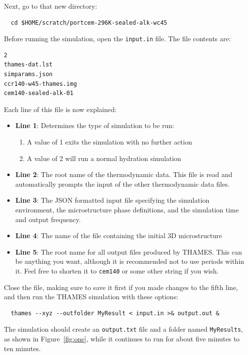 \documentclass{article}
\begin{document}
\normalsize{ }
Next, go to that new directory:
\scriptsize{
	\begin{lstlisting}
  cd $HOME/scratch/portcem-296K-sealed-alk-wc45
\end{lstlisting}
}

\normalsize{ }
Before running the simulation, open the \verb!input.in! file. The file contents
are:
\scriptsize{
	\begin{lstlisting}
2
thames-dat.lst
simparams.json
ccr140-w45-thames.img
cem140-sealed-alk-01
\end{lstlisting}
}

\normalsize{ }
Each line of this file is now explained:
\begin{itemize}
	\item \textbf{Line 1}: Determines the type of simulation to be run:
	      \begin{enumerate}
		      \item A value of 1 exits the simulation with no further action
		      \item A value of 2 will run a normal hydration simulation
	      \end{enumerate}
	\item \textbf{Line 2}: The root name of the thermodynamic data. This file is
	      read and automatically prompts the input of the other thermodynamic data
	      files.
	\item \textbf{Line 3}: The JSON formatted input file specifying the simulation
	      environment, the microstructure phase definitions, and the simulation time
	      and output frequency.
	\item \textbf{Line 4}: The name of the file containing the initial 3D microstructure
	\item \textbf{Line 5}: The root name for all output files produced by THAMES.
	      This can be anything you want, although it is recommended not to use periods
	      within it. Feel free to shorten it to \verb!cem140! or some other string if
	      you wish.
\end{itemize}
Close the file, making sure to save it first if you made changes to the fifth
line, and then run the THAMES simulation with these options:
\scriptsize{
	\begin{lstlisting}
  thames --xyz --outfolder MyResult < input.in >& output.out &
\end{lstlisting}
}

\normalsize{ }
The simulation should create an \verb!output.txt! file and a folder named
\verb!MyResults!, as shown in Figure~\ref{fig:one}, while it continues
to run for about five minutes to ten minutes.
\end{document}
